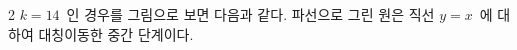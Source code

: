 \documentclass[10pt,fleqn]{article}
\begin{document}
\begin{multicols*}{2}
$k=14$\ 인 경우를 그림으로 보면 다음과 같다. 파선으로 그린 원은 직선 $y=x$\ 에 대하여 대칭이동한 중간 단계이다.


\end{multicols*}
\end{document}
